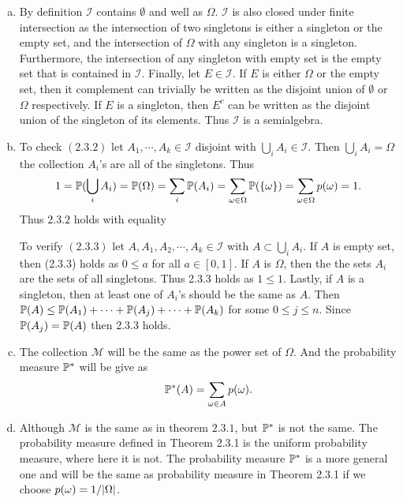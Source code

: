 \begin{solution}
	\begin{enumerate}[(a)]
		\item By definition $ \mathcal{I} $ contains $ \emptyset $ and well as $ \Omega $. $ \mathcal{I} $ is also closed under finite intersection as the intersection of two singletons is either a singleton or the empty set, and the intersection of $ \Omega $ with any singleton is a singleton. Furthermore, the intersection of any singleton with empty set is the empty set that is contained in $ \mathcal{I} $. Finally, let $ E \in \mathcal{I} $. If $ E $ is either $ \Omega $ or the empty set, then it complement can trivially be written as the disjoint union of $ \emptyset $ or $ \Omega $ respectively. If $ E $ is a singleton, then $ E^c $ can be written as the disjoint union of the singleton of its elements. Thus $ \mathcal{I} $ is a semialgebra.
		
		\item To check $ (2.3.2) $ let $ A_1,\cdots,A_k \in \mathcal{I} $ disjoint with $ \bigcup_i A_i \in \mathcal{I} $. Then $ \bigcup_i A_i = \Omega $ the collection $ A_i $'s are all of the singletons. Thus 
		\[ 1 = \mathbb{P}(\bigcup_i A_i) = \mathbb{P}(\Omega) = \sum_i \mathbb{P}(A_i) = \sum_{\omega\in\Omega}\mathbb{P}(\{\omega\}) = \sum_{\omega\in\Omega}p(\omega) = 1. \]
		Thus $ 2.3.2 $ holds with equality
		
		\noindent To verify $ (2.3.3) $ let $ A,A_1,A_2,\cdots,A_k \in \mathcal{I} $ with $ A \subset \bigcup_i A_i $. If $ A $ is empty set, then (2.3.3) holds as $ 0 \leq a $ for all $ a\in [0,1] $. If $ A $ is $ \Omega $, then the the sets $ A_i $ are the sets of all singletons. Thus 2.3.3 holds as $ 1\leq 1 $. Lastly, if $ A $ is a singleton, then at least one of $ A_i $'s should be the same as $ A $. Then $ \mathbb{P}(A) \leq \mathbb{P}(A_1) + \cdots + \mathbb{P}(A_j) +  \cdots + \mathbb{P}(A_k) $ for some $ 0\leq j \leq n $. Since $ \mathbb{P}(A_j) = \mathbb{P}(A) $ then 2.3.3 holds.
		
		\item The collection $ \mathcal{M} $ will be the same as the power set of $ \Omega $. And the probability measure $ \mathbb{P}^* $ will be give as
		\[ \mathbb{P}^*(A) = \sum_{\omega\in A} p(\omega). \]
		
		\item Although $ \mathcal{M} $ is the same as in theorem $ 2.3.1 $, but $ \mathbb{P}^* $ is not the same. The probability measure defined in Theorem 2.3.1 is the uniform probability measure, where here it is not. The probability measure $ \mathbb{P}^* $ is a more general one and will be the same as probability measure in Theorem 2.3.1 if we choose $ p(\omega) = 1/|\Omega| $.
	\end{enumerate}
\end{solution}

